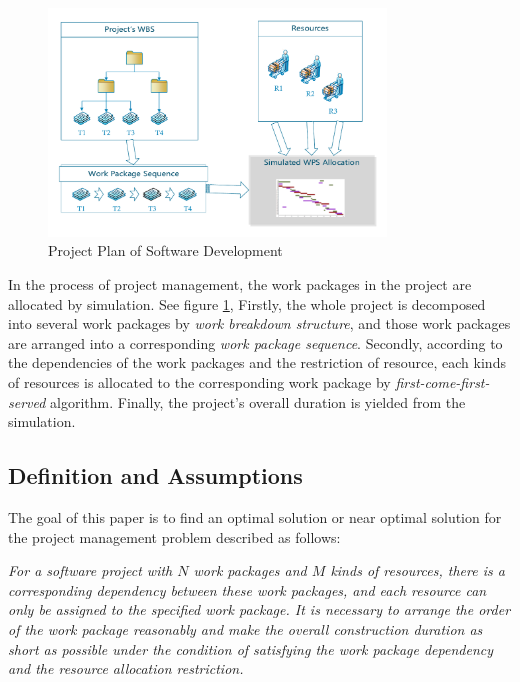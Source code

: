 \begin{figure}[!ht]
  \centering
  \includegraphics[width=0.8\textwidth]{figures/simu.pdf}
  \caption{Project Plan of Software Development}
  \label{fig:simu}
\end{figure}



 In the process of project management, the work packages in the project are
 allocated by simulation. See figure \ref{fig:simu}, Firstly, the whole project
 is decomposed into several work packages by \emph{work breakdown structure},
 and those work packages are arranged into a corresponding \emph{work package
   sequence}. Secondly, according to the dependencies of the work packages and
 the restriction of resource, each kinds of resources is allocated to the
 corresponding work package by \emph{first-come-first-served}
 algorithm. Finally, the project's overall duration is yielded from the simulation.



\subsection{Definition and Assumptions}
%
The goal of this paper is to find an optimal solution or near optimal
solution for the project management problem described as follows:


\emph{
  For a software project with $N$ work packages and $M$ kinds of resources,
  there is a corresponding dependency between these work packages, and each
  resource can only be assigned to the specified work package.  It is necessary
  to arrange the order of the work package reasonably and make the overall
  construction duration as short as possible under the condition of satisfying
  the work package dependency and the resource allocation restriction.
}

